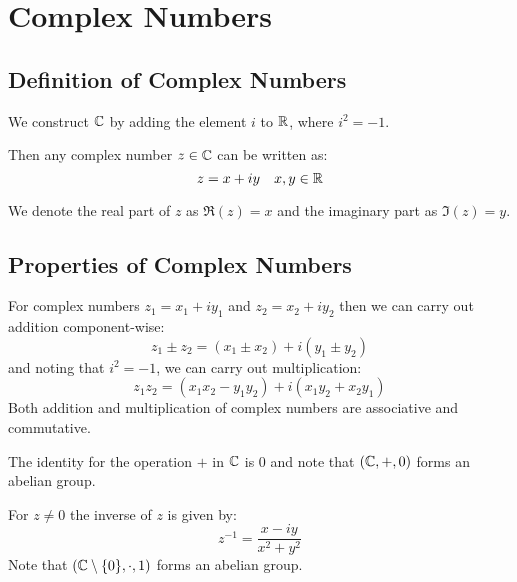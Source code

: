 \documentclass[../main.tex]{subfiles}
\begin{document}
\chapter{Complex Numbers}
\section{Definition of Complex Numbers}
\begin{definition}
  We construct $\mathbb{C}$ by adding the element $i$ to $\mathbb{R}$, where $i^2 = -1$.

  Then any complex number $z \in \mathbb{C}$ can be written as:
  \[
    z = x + iy \quad x, y \in \mathbb{R}
  \]
\end{definition}
We denote the real part of $z$ as $\Re(z) = x$ and the imaginary part as $\Im(z) = y$.
\section{Properties of Complex Numbers}
For complex numbers $z_1 = x_1 + i y_1$ and $z_2 = x_2 + i y_2$ then we can carry out addition component-wise:
\[
  z_1 \pm z_2 = (x_1 \pm x_2) + i(y_ 1 \pm y_2) 
\]
and noting that $i^2 = -1$, we can carry out multiplication:
\begin{equation}
  z_1 z_2 = (x_1 x_2 - y_1 y_2) + i(x_1 y_2 + x_2 y_1)
  \label{complexMult}
\end{equation}
Both addition and multiplication of complex numbers are associative and commutative.

The identity for the operation $+$ in $\mathbb{C}$ is 0 and note that $(\mathbb{C}, +, 0)$ forms an abelian group.

For $z \neq 0$ the inverse of $z$ is given by:
\begin{equation}
  z^{-1} = \frac{x - iy}{x^2 + y^2}
  \label{inverse}
\end{equation}
Note that $(\mathbb{C} \setminus \{0\}, \cdot, 1)$ forms an abelian group.
\end{document}
